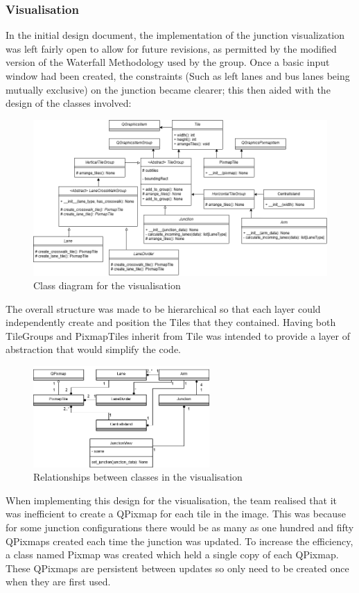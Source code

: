 \documentclass{article}
\begin{document}
    \subsubsection{Visualisation}
    In the initial design document, the implementation of the junction visualization was left fairly open to allow for future revisions, as permitted by the
    modified version of the Waterfall Methodology used by the group. Once a basic input window had been created, the constraints (Such as left lanes and bus
    lanes being mutually exclusive) on the junction became clearer; this then aided with the design of the classes involved:
    \begin{figure}[H]
        \centering
        \includegraphics[width=\textwidth]{visualisation_class}
        \caption{Class diagram for the visualisation}
        \label{fig:visualisation_class}
    \end{figure}
    The overall structure was made to be hierarchical so that each layer could independently create and position the Tiles that they contained. Having both
    TileGroups and PixmapTiles inherit from Tile was intended to provide a layer of abstraction that would simplify the code.
    \begin{figure}[H]
        \centering
        \includegraphics[width=0.6\textwidth]{visualisation_relationship}
        \caption{Relationships between classes in the visualisation}
        \label{fig:visualisation_relationship}
    \end{figure}
    When implementing this design for the visualisation, the team realised that it was inefficient to create a QPixmap for each tile in the image. This
    was because for some junction configurations there would be as many as one hundred and fifty QPixmaps created each time the junction was updated. To
    increase the efficiency, a class named Pixmap was created which held a single copy of each QPixmap. These QPixmaps are persistent between updates so
    only need to be created once when they are first used.\\
\end{document}
